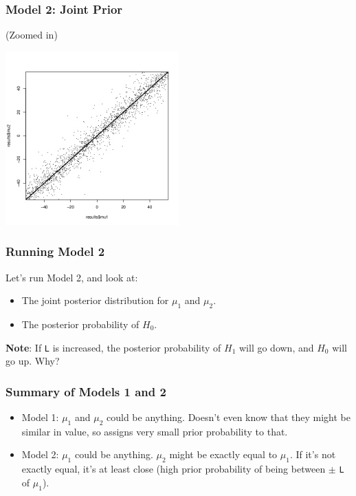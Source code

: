 \documentclass{beamer}
\begin{document}
\begin{frame}[fragile]
\frametitle{Model 2: Joint Prior}
(Zoomed in)
\begin{center}
\includegraphics[width=0.5\textwidth]{images/ttest_prior2.png}
\end{center}

\end{frame}


\begin{frame}[fragile]
\frametitle{Running Model 2}
Let's run Model 2, and look at:\pause

\begin{itemize}
\item The joint posterior distribution for $\mu_1$ and $\mu_2$.\pause
\item The posterior probability of $H_0$.\pause
\end{itemize}

{\bf Note}: If \texttt{L} is increased, the posterior probability of
$H_1$ will go down, and $H_0$ will go up. Why?
\end{frame}


\begin{frame}[fragile]
\frametitle{Summary of Models 1 and 2}
\begin{itemize}
\item Model 1: $\mu_1$ and $\mu_2$ could be anything. Doesn't even know that
they might be similar in value, so assigns very small prior probability to that.\pause
\item Model 2: $\mu_1$ could be anything. $\mu_2$ might be exactly equal to
$\mu_1$. If it's not exactly equal, it's at least close (high prior probability
of being between $\pm$ \texttt{L} of $\mu_1$). 
\end{itemize}


\end{frame}
\end{document}
